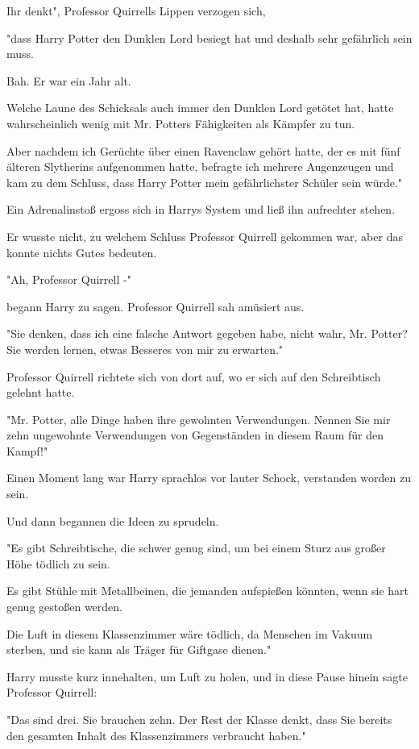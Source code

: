 {Ihr denkt", Professor Quirrells Lippen verzogen sich,

"dass Harry Potter den Dunklen Lord besiegt hat und deshalb sehr gefährlich sein muss.

Bah. Er war ein Jahr alt.

Welche Laune des Schicksals auch immer den Dunklen Lord getötet hat, hatte wahrscheinlich wenig mit Mr. Potters Fähigkeiten als Kämpfer zu tun.

Aber nachdem ich Gerüchte über einen Ravenclaw gehört hatte, der es mit fünf älteren Slytherins aufgenommen hatte, befragte ich mehrere Augenzeugen und kam zu dem Schluss, dass Harry Potter mein gefährlichster Schüler sein würde."

Ein Adrenalinstoß ergoss sich in Harrys System und ließ ihn aufrechter stehen.

Er wusste nicht, zu welchem Schluss Professor Quirrell gekommen war, aber das konnte nichts Gutes bedeuten.

"Ah, Professor Quirrell -"

begann Harry zu sagen. Professor Quirrell sah amüsiert aus.

"Sie denken, dass ich eine falsche Antwort gegeben habe, nicht wahr, Mr. Potter? Sie werden lernen, etwas Besseres von mir zu erwarten."

Professor Quirrell richtete sich von dort auf, wo er sich auf den Schreibtisch gelehnt hatte.

"Mr. Potter, alle Dinge haben ihre gewohnten Verwendungen. Nennen Sie mir zehn ungewohnte Verwendungen von Gegenständen in diesem Raum für den Kampf!"

Einen Moment lang war Harry sprachlos vor lauter Schock, verstanden worden zu sein.

Und dann begannen die Ideen zu sprudeln.

"Es gibt Schreibtische, die schwer genug sind, um bei einem Sturz aus großer Höhe tödlich zu sein.

Es gibt Stühle mit Metallbeinen, die jemanden aufspießen könnten, wenn sie hart genug gestoßen werden.

Die Luft in diesem Klassenzimmer wäre tödlich, da Menschen im Vakuum sterben, und sie kann als Träger für Giftgase dienen."

Harry musste kurz innehalten, um Luft zu holen, und in diese Pause hinein sagte Professor Quirrell:

"Das sind drei. Sie brauchen zehn. Der Rest der Klasse denkt, dass Sie bereits den gesamten Inhalt des Klassenzimmers verbraucht haben."

}
